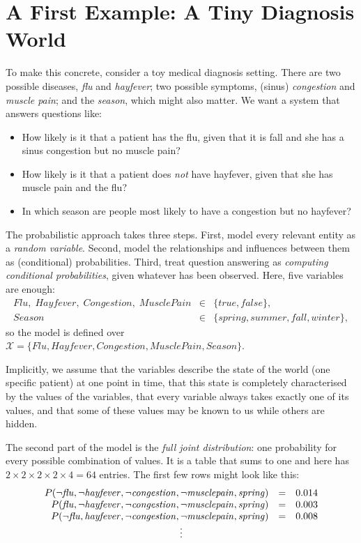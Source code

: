 \documentclass[11pt, oneside]{book}
\newcommand{\Xall}{\mathcal{X}}          %
\newcommand{\vn}[1]{\mathit{#1}}         %
\let\originalsection\section
\renewcommand{\section}{\Needspace{7\baselineskip}\originalsection}
\begin{document}
\section{A First Example: A Tiny Diagnosis World}
\label{sec:diagnosis-world}

To make this concrete, consider a toy medical diagnosis setting. There are two
possible diseases, \emph{flu} and \emph{hayfever}; two possible symptoms,
(sinus) \emph{congestion} and \emph{muscle pain}; and the \emph{season}, which
might also matter. We want a system that answers questions like:
\begin{itemize}
  \item How likely is it that a patient has the flu, given that it is fall and
    she has a sinus congestion but no muscle pain?
  \item How likely is it that a patient does \emph{not} have hayfever, given
    that she has muscle pain and the flu?
  \item In which season are people most likely to have a congestion but no
    hayfever?
\end{itemize}

The probabilistic approach takes three steps. First, model every relevant
entity as a \emph{random variable}. Second, model the relationships and
influences between them as (conditional) probabilities. Third, treat question
answering as \emph{computing conditional probabilities}, given whatever has
been observed. Here, five variables are enough:
\[
\begin{array}{rcl}
  \vn{Flu}, \;\vn{Hayfever}, \;\vn{Congestion}, \;\vn{MusclePain}
    & \in & \{\vn{true}, \vn{false}\}, \\
  \vn{Season} & \in & \{\vn{spring}, \vn{summer}, \vn{fall}, \vn{winter}\},
\end{array}
\]
so the model is defined over
$\Xall = \{\vn{Flu}, \vn{Hayfever}, \vn{Congestion}, \vn{MusclePain}, \vn{Season}\}$.

Implicitly, we assume that the variables describe the state of the world (one
specific patient) at one point in time, that this state is completely
characterised by the values of the variables, that every variable always takes
exactly one of its values, and that some of these values may be known to us
while others are hidden.

The second part of the model is the \emph{full joint distribution}: one
probability for every possible combination of values. It is a table that sums
to one and here has $2 \times 2 \times 2 \times 2 \times 4 = 64$ entries. The
first few rows might look like this:
\[
\begin{array}{rcl}
  P(\neg\vn{flu}, \neg\vn{hayfever}, \neg\vn{congestion}, \neg\vn{musclepain}, \vn{spring}) &=& 0.014 \\
  P(\vn{flu}, \neg\vn{hayfever}, \neg\vn{congestion}, \neg\vn{musclepain}, \vn{spring}) &=& 0.003 \\
  P(\neg\vn{flu}, \vn{hayfever}, \neg\vn{congestion}, \neg\vn{musclepain}, \vn{spring}) &=& 0.008 \\
  \multicolumn{3}{c}{\vdots}
\end{array}
\]
\end{document}
